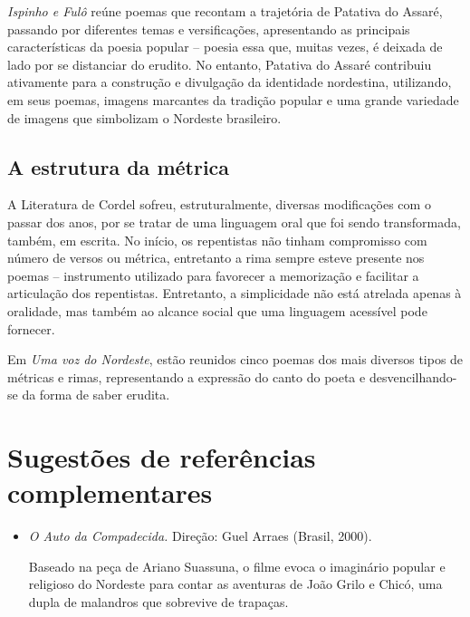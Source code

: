 \documentclass[12pt]{extarticle}
\begin{document}
{\emph{Ispinho e Fulô} reúne poemas que recontam a trajetória de Patativa
do Assaré, passando por diferentes temas e versificações, apresentando
as principais características da poesia popular -- poesia essa que,
muitas vezes, é deixada de lado por se distanciar do erudito. No
entanto, Patativa do Assaré contribuiu ativamente para a construção e
divulgação da identidade nordestina, utilizando, em seus poemas, imagens
marcantes da tradição popular e uma grande variedade de imagens que
simbolizam o Nordeste brasileiro.

\subsection{A estrutura da métrica}

A Literatura de Cordel sofreu, estruturalmente, diversas modificações
com o passar dos anos, por se tratar de uma linguagem oral que foi sendo
transformada, também, em escrita. No início, os repentistas não tinham
compromisso com número de versos ou métrica, entretanto a rima sempre
esteve presente nos poemas -- instrumento utilizado para favorecer a
memorização e facilitar a articulação dos repentistas. Entretanto, a
simplicidade não está atrelada apenas à oralidade, mas também ao alcance
social que uma linguagem acessível pode fornecer.

Em \emph{Uma voz do Nordeste}, estão reunidos cinco poemas dos mais
diversos tipos de métricas e rimas, representando a expressão do canto
do poeta e desvencilhando-se da forma de saber erudita.


\section{Sugestões de referências complementares}\label{sugestoes}

\begin{itemize}

\subsection{Filmes:}

\item \textit{O Auto da Compadecida.} Direção: Guel Arraes (Brasil, 2000).

Baseado na peça de Ariano Suassuna, o filme evoca o imaginário popular e
religioso do Nordeste para contar as aventuras de João Grilo e Chicó,
uma dupla de malandros que sobrevive de trapaças.


\end{itemize}}
\end{document}
